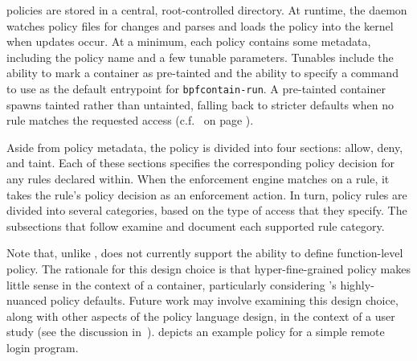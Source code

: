 \bpfcontain{} policies are stored in a central, root-controlled directory. At runtime, the
daemon watches policy files for changes and parses and loads the policy into the kernel
when updates occur. At a minimum, each \bpfcontain{} policy contains some metadata,
including the policy name and a few tunable parameters. Tunables include the ability to
mark a container as pre-tainted and the ability to specify a command to use as the default
entrypoint for \texttt{bpfcontain-run}. A pre-tainted container spawns tainted rather than
untainted, falling back to stricter defaults when no rule matches the requested access
(c.f.\  on page \pageref{fig:bpfcontain-enforcement}).

Aside from policy metadata, the policy is divided into four sections: allow, deny, and
taint. Each of these sections specifies the corresponding policy decision for any rules
declared within. When the \bpfcontain{} enforcement engine matches on a rule, it takes the
rule's policy decision as an enforcement action. In turn, policy rules are divided into
several categories, based on the type of access that they specify. The subsections that
follow examine and document each supported rule category.

Note that, unlike \bpfbox{}, \bpfcontain{} does not currently support the ability to
define function-level policy. The rationale for this design choice is that
hyper-fine-grained policy makes little sense in the context of a container, particularly
considering \bpfcontain{}'s highly-nuanced policy defaults. Future work may involve
examining this design choice, along with other aspects of the \bpfcontain{} policy
language design, in the context of a user study (see the discussion
in~).  depicts an example
\bpfcontain{} policy for a simple remote login program.

